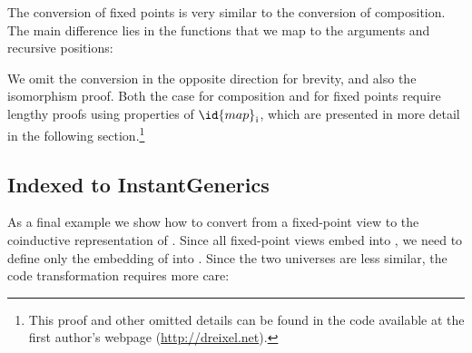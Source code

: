 \documentclass[submission,copyright,creativecommons,sharealike,noncommercial]{eptcs}
\newcommand{\Conid}[1]{\mathit{#1}}
\newcommand{\Varid}[1]{\mathit{#1}}
\def\resethooks{\global\let\SaveRestoreHook\empty
  \global\let\ColumnHook\empty}
\let\hspost\empty
\renewcommand\Varid[1]{\mathord{\textsf{#1}}}
\let\Conid\Varid
\begin{document}
The conversion of \polyp fixed points is very similar to the conversion of
composition. The main difference lies in the functions that we map to the
arguments and recursive positions:

\resethooks

We omit the conversion in the opposite direction for brevity, and also the
isomorphism proof. Both the case for composition and for \polyp fixed points
require lengthy proofs using properties of \ensuremath{\id{map}_{\kern0.05em \Varid{i}}}, which are presented
in more detail in the following section.\footnote{This proof and other omitted details can be found in the code
available at the first author's webpage (\url{http://dreixel.net}).}


\subsection{Indexed to InstantGenerics}
\label{sec:Indexed2IG}
As a final example we show how to convert from a fixed-point view to the
coinductive representation of \ig. Since all fixed-point views embed into
\indexed, we need to define only the embedding of \indexed into \ig. Since
the two universes are less similar, the code transformation requires more care:
\end{document}
